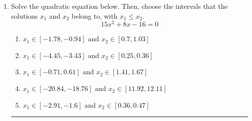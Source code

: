 \documentclass[14pt]{extbook}
\newcommand{\litem}[1]{\item#1\hspace*{-1cm}\rule{\textwidth}{0.4pt}}
\begin{document}
\begin{enumerate}
{\begin{enumerate}[label=\Alph*.]
\end{enumerate} }
\litem{
Solve the quadratic equation below. Then, choose the intervals that the solutions $x_1$ and $x_2$ belong to, with $x_1 \leq x_2$.\[ 15x^{2} +8 x -16 = 0 \]\begin{enumerate}[label=\Alph*.]
\item \( x_1 \in [-1.78, -0.94] \text{ and } x_2 \in [0.7, 1.03] \)
\item \( x_1 \in [-4.45, -3.43] \text{ and } x_2 \in [0.25, 0.36] \)
\item \( x_1 \in [-0.71, 0.61] \text{ and } x_2 \in [1.41, 1.67] \)
\item \( x_1 \in [-20.84, -18.76] \text{ and } x_2 \in [11.92, 12.11] \)
\item \( x_1 \in [-2.91, -1.6] \text{ and } x_2 \in [0.36, 0.47] \)


\end{enumerate}}
\end{enumerate}
\end{document}
